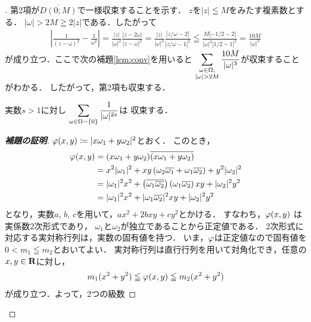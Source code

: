 \begin{proof}[\pfb]
    第2項が$\overline{D(0;M)}$で一様収束することを示す．
    $z$を$|z|\leqq M$をみたす複素数とする．
    $|\omega|>2M\geqq2|z|$である．したがって
    \begin{align*}
        \left|\frac{1}{(z-\omega)^2}-\frac{1}{\omega^2}\right|
        =\frac{|z|}{|\omega|^2}\frac{|z-2\omega|}{|z-\omega|^2}
        =\frac{|z|}{|\omega|^3}\frac{|z/\omega-2|}{|z/\omega-1|^2}
        \leqq\frac{M|-1/2-2|}{|\omega|^3|1/2-1|^2}
        =\frac{10M}{|\omega|^3}    
    \end{align*}
    が成り立つ．ここで次の補題\ref{lem:conv}を用いると
    $\dip \sum_{\substack{\omega\in\Omega,\\|\omega|>2M}}
    \frac{10M}{|\omega|^{3}}$が収束することがわかる．
    したがって，第2項も収束する．
    \begin{Lemma}\label{lem:conv}
        実数$s>1$に対し
        $\displaystyle \sum_{\omega\in\Omega-\{0\}}\frac{1}{|\omega|^{2s}}$は
        収束する．
    \end{Lemma}
    \begin{proof}[\textbf{補題の証明}]
        $\varphi(x,y)\coloneqq |x\omega_1+y\omega_2|^2$とおく．
        このとき，
        \begin{align*}
            \varphi(x,y)
            &=(x\omega_1+y\omega_2)\overline{(x\omega_1+y\omega_2)}\\
            &=x^2|\omega_1|^2+xy\left(
                \omega_2\overline{\omega_1}+\omega_1\overline{\omega_2}
                \right)+y^2|\omega_2|^2\\
            &=|\omega_1|^2x^2+\left(
                \overline{\omega_1\overline{\omega_2}}
                \right)\left(\omega_1\overline{\omega_2}
                \right)xy+|\omega_2|^2y^2\\
            &=|\omega_1|^2x^2+|\omega_1\overline{\omega_2}|^2xy+|\omega_2|^2y^2
        \end{align*}
        となり，実数$a$, $b$, $c$を用いて，$ax^2+2bxy+cy^2$とかける．
        すなわち，$\varphi(x,y)$ は実係数2次形式であり，
        $\omega_1$と$\omega_2$が独立であることから正定値である．
        2次形式に対応する実対称行列は，実数の固有値を持つ．
        いま，$\varphi$は正定値なので固有値を$0< m_1\leqq m_2$とおいてよい．
        実対称行列は直行行列を用いて対角化でき，任意の$x,y\in\mathbf{R}$に対し，
        \begin{align*}
            m_1(x^2+y^2)\leqq\varphi(x,y)\leqq m_2(x^2+y^2)
        \end{align*}
        が成り立つ．よって，2つの級数

\end{proof}
\end{proof}

